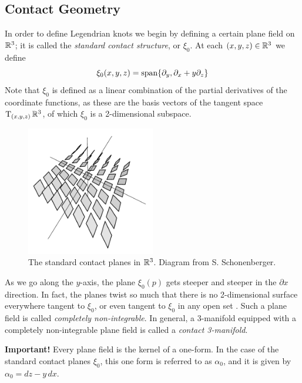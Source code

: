 \subsection{Contact Geometry}

In order to define Legendrian knots we begin by defining a certain plane field on $\mathbb{R}^3$; it is called the \emph{standard contact structure}, or $\xi_0$. At each $(x, y, z) \in \mathbb{R}^3$ we define
\[
    \xi_0(x, y, z) = \operatorname{span} \{\partial_y,
                                   \partial_x + y\partial_z\}
\]
Note that $\xi_0$ is defined as a linear combination of the partial derivatives of the coordinate functions, as these are the basis vectors of the tangent space $\operatorname{T}_{(x, y, z)} \mathbb{R}^3$, of which $\xi_0$ is a 2-dimensional subspace.

\begin{figure}[ht]
    \centering
    \includegraphics[width=0.5\textwidth]{images/contact-planes.pdf}
    \caption{The standard contact planes in $\mathbb{R}^3$. Diagram from S. Schonenberger.}%
    \label{fig:contact-planes}
\end{figure}

As we go along the $y$-axis, the plane $\xi_0(p)$  gets steeper and steeper in the $\partial x$ direction. In fact, the planes twist so much that there is no 2-dimensional surface everywhere tangent to $\xi_0$, or even tangent to $\xi_0$ in any open set \cite{boothby}.
Such a plane field is called \emph{completely non-integrable}.
In general, a 3-manifold equipped with a completely non-integrable plane field is called a \emph{contact 3-manifold}.

\textbf{Important!} Every plane field is the kernel of a one-form. In the case of the standard contact planes $\xi_0$, this one form is referred to as $\alpha_0$, and it is given by $\alpha_0 = dz - y \, dx$.

